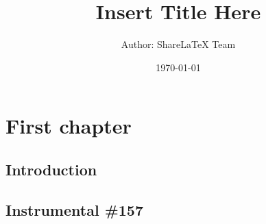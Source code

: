 \documentclass{book} %
\title{Insert Title Here}
\author{Author: ShareLaTeX Team}
\date{\today}
\begin{document}
\frontmatter

\mainmatter
\chapter{First chapter}

  


    \section{Introduction}


    \section{Instrumental \#157}
\end{document}
